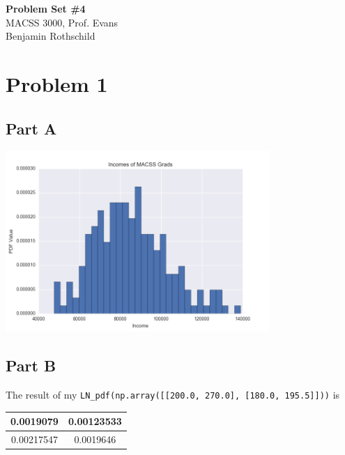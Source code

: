 \documentclass{article}
\begin{document}
\begin{flushleft}
    \textbf{\large{Problem Set \#4}} \\
    MACSS 3000, Prof. Evans \\
    Benjamin Rothschild
\end{flushleft}

\section*{Problem 1}
\subsection*{Part A}
\begin{center}\includegraphics[width=100mm]{images/1a.png}\end{center}

\subsection*{Part B}
The result of my \texttt{LN\_pdf(np.array([[200.0, 270.0], [180.0, 195.5]]))} is
\begin{center}
  \begin{tabular}{ c | c }
    \hline
    0.0019079 & 0.00123533 \\ \hline
    0.00217547 & 0.0019646 \\
    \hline
  \end{tabular}
\end{center}
\end{document}
